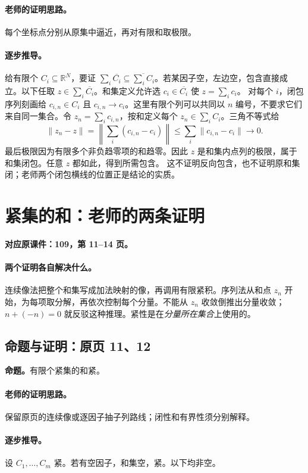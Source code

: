 \documentclass[11pt,a4paper]{article}
\newcommand{\R}{\mathbb{R}}\newcommand{\N}{\mathbb{N}}
\theoremstyle{definition}\newtheorem{definition}{定义}\newtheorem{example}{例}
\begin{document}
\paragraph{老师的证明思路。}每个坐标点分别从原集中逼近，再对有限和取极限。

\paragraph{逐步推导。}
给有限个 $C_i\subseteq\R^N$，要证 $\sum_i\overline{C_i}\subseteq\overline{\sum_iC_i}$。若某因子空，左边空，包含直接成立。以下任取 $z\in\sum_i\overline{C_i}$。和集定义允许选 $c_i\in\overline{C_i}$ 使 $z=\sum_i c_i$。
对每个 $i$，闭包序列刻画给 $c_{i,n}\in C_i$ 且 $c_{i,n}\to c_i$。这里有限个列可以共同以 $n$ 编号，不要求它们来自同一集合。令 $z_n=\sum_i c_{i,n}$，按和定义每个 $z_n\in\sum_i C_i$。三角不等式给
\[\|z_n-z\|=\left\|\sum_i(c_{i,n}-c_i)\right\|\le\sum_i\|c_{i,n}-c_i\|\to0.\]
最后极限因为有限多个非负趋零项的和趋零。因此 $z$ 是和集内点列的极限，属于和集闭包。任意 $z$ 都如此，得到所需包含。
这不证明反向包含，也不证明原和集闭；老师两个闭包横线的位置正是结论的实质。


\clearpage\section{紧集的和：老师的两条证明}\label{g:109:11}

\textbf{对应原课件：109，第 11--14 页。}


\paragraph{两个证明各自解决什么。}
连续像法把整个和集写成加法映射的像，再调用有限紧积。序列法从和点 $z_n$ 开始，为每项取分解，再依次控制每个分量。不能从 $z_n$ 收敛倒推出分量收敛；$n+(-n)=0$ 就反驳这种推理。紧性是在\emph{分量所在集合}上使用的。


\subsection{命题与证明：原页 11、12}

\textbf{命题。}有限个紧集的和紧。

\paragraph{老师的证明思路。}保留原页的连续像或逐因子抽子列路线；闭性和有界性须分别解释。

\paragraph{逐步推导。}
设 $C_1,\ldots,C_m$ 紧。若有空因子，和集空，紧。以下均非空。
\end{document}
